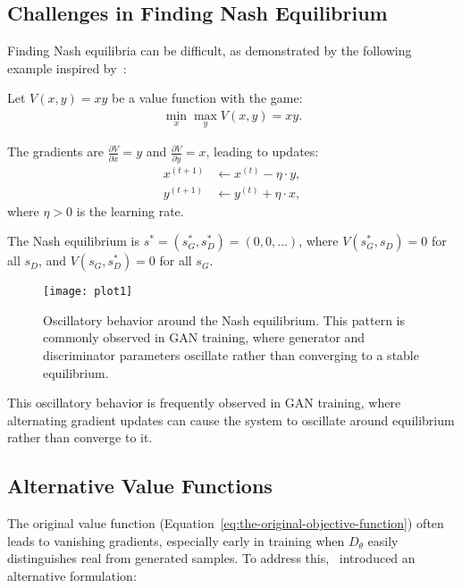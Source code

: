\subsection{Challenges in Finding Nash Equilibrium}%
\label{sec:difficulty}

Finding Nash equilibria can be difficult, as demonstrated by the following example inspired by~\cite{ref:weng-2017}:

\begin{example}
  Let $V(x, y) = xy$ be a value function with the game:
  \begin{align}
    \min_x \max_y V(x, y) = xy.
  \end{align}
  
  The gradients are $\frac{\partial V}{\partial x} = y$ and $\frac{\partial V}{\partial y} = x$, leading to updates:
  \begin{align}
    x^{(t+1)} & \gets x^{(t)} - \eta \cdot y, \\
    y^{(t+1)} & \gets y^{(t)} + \eta \cdot x,
  \end{align}
  where $\eta > 0$ is the learning rate.
  
  The Nash equilibrium is $s^* = (s_G^*, s_D^*) = (0, 0, \dots)$, where $V(s_G^*, s_D) = 0$ for all $s_D$, and $V(s_G, s_D^*) = 0$ for all $s_G$.
  
  \begin{figure}[H]
    \centering
    \texttt{[image: plot1]}
    \caption{Oscillatory behavior around the Nash equilibrium. This pattern is commonly observed in GAN training, where generator and discriminator parameters oscillate rather than converging to a stable equilibrium.}%
    \label{fig:alternating}
  \end{figure}
\end{example}

This oscillatory behavior is frequently observed in GAN training, where alternating gradient updates can cause the system to oscillate around equilibrium rather than converge to it.

\subsection{Alternative Value Functions}%
\label{sec:two-value}

The original value function (Equation~\ref{eq:the-original-objective-function}) often leads to vanishing gradients, especially early in training when $D_\theta$ easily distinguishes real from generated samples. To address this,~\cite{ref:goodfellow-original} introduced an alternative formulation:

